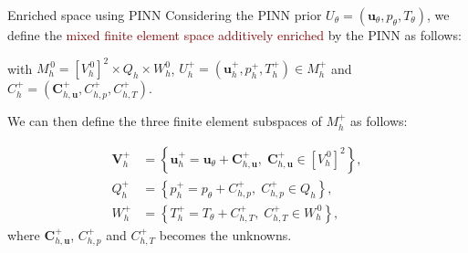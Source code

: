 
\begin{appendixframe}{Enriched space using PINN}
    Considering the PINN prior $U_\theta = (\bm{u}_\theta, p_\theta, T_\theta)$, we define the \textcolor{darkred}{mixed finite element space additively enriched} by the PINN as follows:
    
    \begin{center}
    \end{center}

    with $M_h^{\, 0}=[V_h^{\, 0}]^2 \times Q_h \times W_h^0$,
    $U_h^+ = (\bm{u}_h^+, p_h^+, T_h^+) \in M_h^+$ and $C_h^+ = (\bm{C}_{h,\bm{u}}^+, C_{h,p}^+, C_{h,T}^+)$.

    \vspace{8pt}

    We can then define the three finite element subspaces of $M_h^+$ as follows:
    \begin{minipage}{0.6\linewidth}
        \vspace{-15pt}
        \begin{align*}
            \bm{V}_h^+ &= \left\{\bm{u}_h^+ = \bm{u}_\theta + \bm{C}_{h,\bm{u}}^+, \; \bm{C}_{h,\bm{u}}^+ \in [V_h^{\, 0}]^2\right\}, \\
            Q_h^+ &= \left\{p_h^+ = p_\theta + C_{h,p}^+, \; C_{h,p}^+ \in Q_h\right\}, \\
            W_h^+ &= \left\{T_h^+ = T_\theta + C_{h,T}^+, \; C_{h,T}^+ \in W_h^{\, 0}\right\},
        \end{align*}
        where $\bm{C}_{h,\bm{u}}^+$, $C_{h,p}^+$ and $C_{h,T}^+$ becomes the unknowns.
        
    \end{minipage}
    \begin{minipage}{0.38\linewidth}
        \centering
        \vspace{5pt}
    \end{minipage}
\end{appendixframe}

